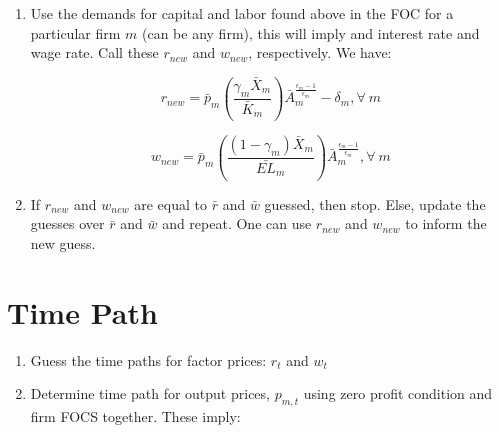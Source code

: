\documentclass[letterpaper,12pt]{article}
\theoremstyle{definition}
\begin{document}
\begin{spacing}{1.5}
\begin{enumerate}
\item Use the demands for capital and labor found above in the FOC for a particular firm $m$ (can be any firm), this will imply and interest rate and wage rate.  Call these $r_{new}$ and $w_{new}$, respectively.  We have:

	\begin{equation}
	r_{new} = \bar{p}_{m}\left(\frac{\gamma_{m}\bar{X}_{m}}{\bar{K}_{m}}\right)\bar{A}_{m}^{\frac{\epsilon_{m}-1}{\epsilon_{m}}}-\delta_{m}, \forall \ m
	\end{equation}

	\begin{equation}
	w_{new} = \bar{p}_{m}\left(\frac{(1-\gamma_{m})\bar{X}_{m}}{\bar{EL}_{m}}\right)\bar{A}_{m}^{\frac{\epsilon_{m}-1}{\epsilon_{m}}}, \forall \ m
	\end{equation}

\item If $r_{new}$ and $w_{new}$ are equal to $\bar{r}$ and $\bar{w}$ guessed, then stop.  Else, update the guesses over $\bar{r}$ and $\bar{w}$ and repeat.  One can use $r_{new}$ and $w_{new}$ to inform the new guess.

\end{enumerate}



\section{Time Path}

\begin{enumerate}
\item Guess the time paths for factor prices: $r_{t}$ and $w_{t}$
\item Determine time path for output prices, $p_{m,t}$ using zero profit condition and firm FOCS together. These imply:


\end{enumerate}
\end{spacing}
\end{document}
